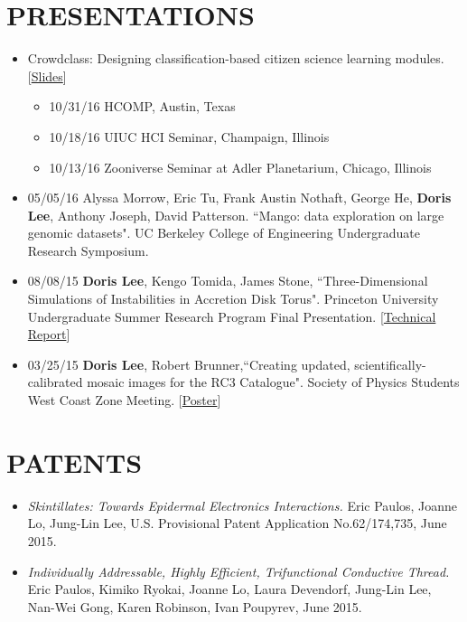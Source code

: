 \documentclass{res}
\begin{document}
\begin{resume}
\section{PRESENTATIONS}
\begin{itemize}
\item Crowdclass: Designing classification-based citizen science learning modules. [\href{http://dorisjunglinlee.com/files/crowdclass_slides.pdf}{Slides}]
	\begin{itemize}[label={$\circ$}]
	\item 10/31/16 HCOMP, Austin, Texas
	\item 10/18/16 UIUC HCI Seminar, Champaign, Illinois
	\item 10/13/16 Zooniverse Seminar at Adler Planetarium, Chicago, Illinois
	\end{itemize}
\item 05/05/16 Alyssa Morrow, Eric Tu, Frank Austin Nothaft, George He, \textbf{Doris Lee},  Anthony Joseph, David Patterson. ``Mango: data exploration on large genomic datasets". UC Berkeley College of Engineering Undergraduate Research Symposium.
\item 08/08/15 \textbf{Doris Lee}, Kengo Tomida, James Stone, ``Three-Dimensional Simulations of Instabilities in Accretion Disk Torus". Princeton University Undergraduate Summer Research Program Final Presentation. [\href{http://dorisjunglinlee.com/files/PrincetonUSRPreport.pdf}{Technical Report}]
\item 03/25/15 \textbf{Doris Lee}, Robert Brunner,``Creating updated, scientifically-calibrated mosaic images for the RC3 Catalogue". Society of Physics Students West Coast Zone Meeting. [\href{http://dorisjunglinlee.com/files/rc3_poster_sps_zone_meeting.pdf}{Poster}]
\end{itemize}
\vspace{-10pt}
\section{PATENTS}
\begin{itemize}
\item \textit{Skintillates: Towards Epidermal Electronics Interactions.} Eric Paulos, Joanne Lo, Jung-Lin Lee, U.S. Provisional Patent Application No.62/174,735, June 2015.
\item \textit{Individually Addressable, Highly Efficient, Trifunctional Conductive Thread.} Eric Paulos, Kimiko Ryokai, Joanne Lo, Laura Devendorf, Jung-Lin Lee, Nan-Wei Gong, Karen Robinson, Ivan Poupyrev, June 2015.
\end{itemize}
\vspace{-10pt}

\end{resume}
\end{document}
